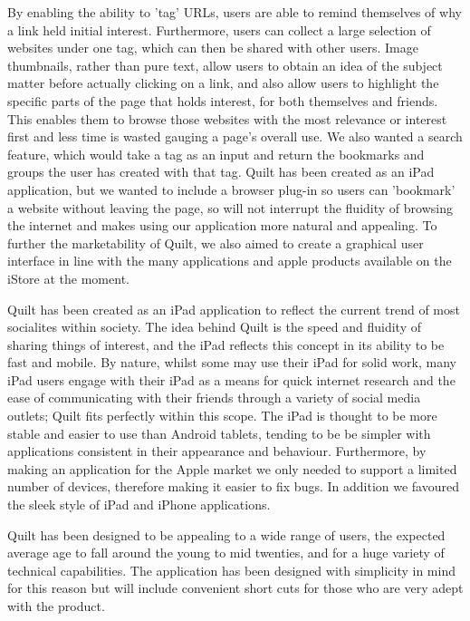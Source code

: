 \documentclass[a4wide, 10pt]{article}
\begin{document}
By enabling the ability to 'tag' URLs, users are able to remind themselves of why a link held initial interest. Furthermore, users can collect a large selection of websites under one tag, which can then be shared with other users. Image thumbnails, rather than pure text, allow users to obtain an idea of the subject matter before actually clicking on a link, and also allow users to highlight the specific parts of the page that holds interest, for both themselves and friends. This enables them to browse those websites with the most relevance or interest first and less time is wasted gauging a page's overall use. We also wanted a search feature, which would take a tag as an input and return the bookmarks and groups the user has created with that tag. Quilt has been created as an iPad application, but we wanted to include a browser plug-in so users can 'bookmark' a website without leaving the page, so will not interrupt the fluidity of browsing the internet and makes using our application more natural and appealing. To further the marketability of Quilt, we also aimed to create a graphical user interface in line with the many applications and apple products available on the iStore at the moment.

Quilt has been created as an iPad application to reflect the current trend of most socialites within society. The idea behind Quilt is the speed and fluidity of sharing things of interest, and the iPad reflects this concept in its ability to be fast and mobile. By nature, whilst some may use their iPad for solid work, many iPad users engage with their iPad as a means for quick internet research and the ease of communicating with their friends through a variety of social media outlets; Quilt fits perfectly within this scope. The iPad is thought to be more stable and easier to use than Android tablets, tending to be be simpler with applications consistent in their appearance and behaviour. Furthermore, by making an application for the Apple market we only needed to support a limited number of devices, therefore making it easier to fix bugs. In addition we favoured the sleek style of iPad and iPhone applications.

Quilt has been designed to be appealing to a wide range of users, the expected average age to fall around the young to mid twenties, and for a huge variety of technical capabilities. The application has been designed with simplicity in mind for this reason but will include convenient short cuts for those who are very adept with the product.
\end{document}
